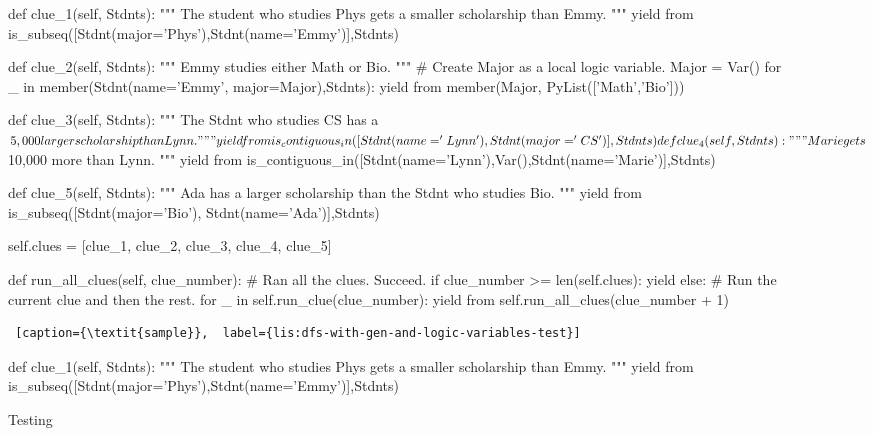 
\newpage

\begin{figure*}[htb]
\flushright
\begin{minipage}[c]{0.95\textwidth}
\begin{python1}
def clue_1(self, Stdnts):
  """ The student who studies Phys gets a smaller scholarship than Emmy. """
  yield from is_subseq([Stdnt(major='Phys'),Stdnt(name='Emmy')],Stdnts)

def clue_2(self, Stdnts):
  """ Emmy studies either Math or Bio. """
  # Create Major as a local logic variable.
  Major = Var()
  for _ in member(Stdnt(name='Emmy', major=Major),Stdnts):
    yield from member(Major, PyList(['Math','Bio'])) 
  
def clue_3(self, Stdnts):
  """ The Stdnt who studies CS has a $5,000 larger scholarship than Lynn. """
  yield from is_contiguous_in([Stdnt(name='Lynn'), Stdnt(major='CS')], Stdnts)
  
def clue_4(self, Stdnts):
  """ Marie gets $10,000 more than Lynn. """
  yield from is_contiguous_in([Stdnt(name='Lynn'),Var(),Stdnt(name='Marie')],Stdnts)
  
def clue_5(self, Stdnts):
  """ Ada has a larger scholarship than the Stdnt who studies Bio. """
  yield from is_subseq([Stdnt(major='Bio'), Stdnt(name='Ada')],Stdnts)

self.clues = [clue_1, clue_2, clue_3, clue_4, clue_5] 

def run_all_clues(self, clue_number):
  # Ran all the clues. Succeed.
  if clue_number >= len(self.clues): yield
  else:
    # Run the current clue and then the rest.
    for _ in self.run_clue(clue_number):
      yield from self.run_all_clues(clue_number + 1)
\end{python1}\linv
\begin{lstlisting} [caption={\textit{sample}},  label={lis:dfs-with-gen-and-logic-variables-test}]
\end{lstlisting}
\end{minipage}\linv
\end{figure*}

\begin{figure}[htb]
    \centering
    \begin{minipage}[c]{0.45\textwidth}
\begin{python1}
def clue_1(self, Stdnts):
  """ The student who studies Phys gets a smaller scholarship than Emmy. """
  yield from is_subseq([Stdnt(major='Phys'),Stdnt(name='Emmy')],Stdnts)
\end{python1}
\end{minipage}
    \caption{Testing}
    \label{fig:my_label}
\end{figure}
